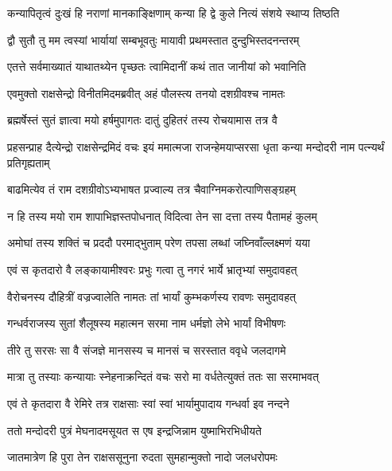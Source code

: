 \twolineshloka
{कन्यापितृत्वं दुःखं हि नराणां मानकाङ्क्षिणाम्}
{कन्या हि द्वे कुले नित्यं संशये स्थाप्य तिष्ठति} %

\twolineshloka
{द्वौ सुतौ तु मम त्वस्यां भार्यायां सम्बभूवतुः}
{मायावी प्रथमस्तात दुन्दुभिस्तदनन्तरम्} %

\twolineshloka
{एतत्ते सर्वमाख्यातं याथातथ्येन पृच्छतः}
{त्वामिदानीं कथं तात जानीयां को भवानिति} %

\twolineshloka
{एवमुक्तो राक्षसेन्द्रो विनीतमिदमब्रवीत्}
{अहं पौलस्त्य तनयो दशग्रीवश्च नामतः} %

\twolineshloka
{ब्रह्मर्षेस्तं सुतं ज्ञात्वा मयो हर्षमुपागतः}
{दातुं दुहितरं तस्य रोचयामास तत्र वै} %

\threelineshloka
{प्रहसन्प्राह दैत्येन्द्रो राक्षसेन्द्रमिदं वचः}
{इयं ममात्मजा राजन्हेमयाप्सरसा धृता}
{कन्या मन्दोदरी नाम पत्न्यर्थं प्रतिगृह्यताम्} %

\twolineshloka
{बाढमित्येव तं राम दशग्रीवोऽभ्यभाषत}
{प्रज्वाल्य तत्र चैवाग्निमकरोत्पाणिसङ्ग्रहम्} %

\twolineshloka
{न हि तस्य मयो राम शापाभिज्ञस्तपोधनात्}
{विदित्वा तेन सा दत्ता तस्य पैतामहं कुलम्} %

\twolineshloka
{अमोघां तस्य शक्तिं च प्रददौ परमाद्भुताम्}
{परेण तपसा लब्धां जघ्निवाँल्लक्ष्मणं यया} %

\twolineshloka
{एवं स कृतदारो वै लङ्कायामीश्वरः प्रभुः}
{गत्वा तु नगरं भार्ये भ्रातृभ्यां समुदावहत्} %

\twolineshloka
{वैरोचनस्य दौहित्रीं वज्रज्वालेति नामतः}
{तां भार्यां कुम्भकर्णस्य रावणः समुदावहत्} %

\twolineshloka
{गन्धर्वराजस्य सुतां शैलूषस्य महात्मन}
{सरमा नाम धर्मज्ञो लेभे भार्यां विभीषणः} %

\twolineshloka
{तीरे तु सरसः सा वै संजज्ञे मानसस्य च}
{मानसं च सरस्तात ववृधे जलदागमे} %

\twolineshloka
{मात्रा तु तस्याः कन्यायाः स्नेहनाक्रन्दितं वचः}
{सरो मा वर्धतेत्युक्तं ततः सा सरमाभवत्} %

\twolineshloka
{एवं ते कृतदारा वै रेमिरे तत्र राक्षसाः}
{स्वां स्वां भार्यामुपादाय गन्धर्वा इव नन्दने} %

\twolineshloka
{ततो मन्दोदरी पुत्रं मेघनादमसूयत}
{स एष इन्द्रजिन्नाम युष्माभिरभिधीयते} %

\twolineshloka
{जातमात्रेण हि पुरा तेन राक्षससूनुना}
{रुदता सुमहान्मुक्तो नादो जलधरोपमः} %

